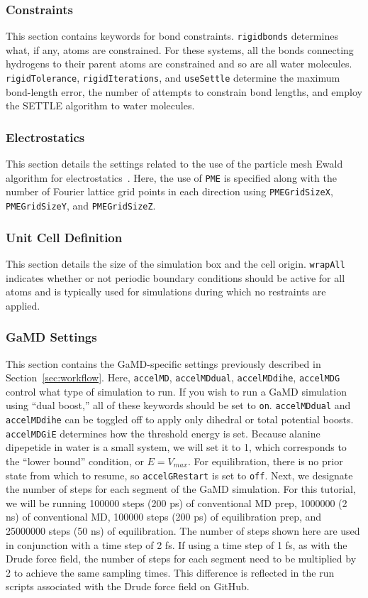 \documentclass[9pt,tutorial,pubversion]{livecoms}
\begin{document}
\subsubsection{Constraints}
This section contains keywords for bond constraints. \texttt{rigidbonds} determines what, if any, atoms are constrained. For these systems, all the bonds connecting hydrogens to their parent atoms are constrained and so are all water molecules. \texttt{rigidTolerance}, \texttt{rigidIterations}, and \texttt{useSettle} determine the maximum bond-length error, the number of attempts to constrain bond lengths, and employ the SETTLE algorithm to water molecules.

\subsubsection{Electrostatics}
This section details the settings related to the use of the particle mesh Ewald algorithm for electrostatics~\cite{darden_pme_1993}. Here, the use of  \texttt{PME} is specified along with the number of Fourier lattice grid points in each direction using \texttt{PMEGridSizeX}, \texttt{PMEGridSizeY}, and \texttt{PMEGridSizeZ}.

\subsubsection{Unit Cell Definition}
This section details the size of the simulation box and the cell origin. \texttt{wrapAll} indicates whether or not periodic boundary conditions should be active for all atoms and is typically used for simulations during which no restraints are applied. 

\subsubsection{GaMD Settings}
This section contains the GaMD-specific settings previously described in Section~\ref{sec:workflow}. Here, \texttt{accelMD}, \texttt{accelMDdual}, \texttt{accelMDdihe}, \texttt{accelMDG} control what type of simulation to run. If you wish to run a GaMD simulation using ``dual boost,'' all of these keywords should be set to \texttt{on}. \texttt{accelMDdual} and \texttt{accelMDdihe} can be toggled off to apply only dihedral or total potential boosts. \texttt{accelMDGiE} determines how the threshold energy is set. Because alanine dipepetide in water is a small system, we will set it to 1, which corresponds to the ``lower bound'' condition, or $E=V_{max}$. For equilibration, there is no prior state from which to resume, so \texttt{accelGRestart} is set to \texttt{off}. Next, we designate the number of steps for each segment of the GaMD simulation. For this tutorial, we will be running 100000 steps (200 ps) of conventional MD prep, 1000000 (2 ns) of conventional MD, 100000 steps (200 ps) of equilibration prep, and 25000000 steps (50 ns) of equilibration. The number of steps shown here are used in conjunction with a time step of 2 fs. If using a time step of 1 fs, as with the Drude force field, the number of steps for each segment need to be multiplied by 2 to achieve the same sampling times. This difference is reflected in the run scripts associated with the Drude force field on GitHub.
\end{document}
